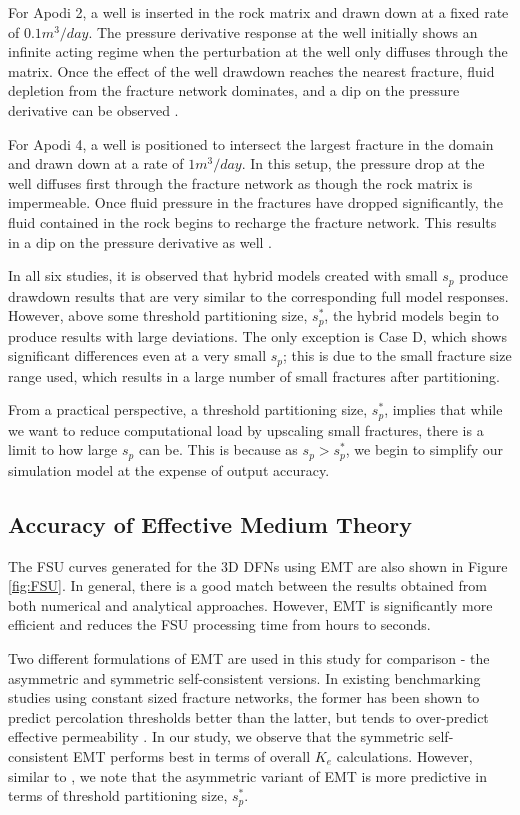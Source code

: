 \documentclass[a4paper]{article}
\begin{document}
For Apodi 2, a well is inserted in the rock matrix and drawn down at a fixed rate of $0.1m^3/day$. The pressure derivative response at the well initially shows an infinite acting regime when the perturbation at the well only diffuses through the matrix. Once the effect of the well drawdown reaches the nearest fracture, fluid depletion from the fracture network dominates, and a dip on the pressure derivative can be observed \citep{Bourdet1989, Cinco-Ley1976, Egya2018}.

For Apodi 4, a well is positioned to intersect the largest fracture in the domain and drawn down at a rate of $1m^3/day$. In this setup, the pressure drop at the well diffuses first through the fracture network as though the rock matrix is impermeable. Once fluid pressure in the fractures have dropped significantly, the fluid contained in the rock begins to recharge the fracture network. This results in a dip on the pressure derivative as well \citep{Gringarten1987}.

In all six studies, it is observed that hybrid models created with small $s_p$ produce drawdown results that are very similar to the corresponding full model responses. However, above some threshold partitioning size, $s_p^*$, the hybrid models begin to produce results with large deviations. The only exception is Case D, which shows significant differences even at a very small $s_p$; this is due to the small fracture size range used, which results in a large number of small fractures after partitioning. 

From a practical perspective, a threshold partitioning size, $s_p^*$, implies that while we want to reduce computational load by upscaling small fractures, there is a limit to how large $s_p$ can be. This is because as $s_p>s_p^*$, we begin to simplify our simulation model at the expense of output accuracy.



\subsection{Accuracy of Effective Medium Theory}
The FSU curves generated for the 3D DFNs using EMT are also shown in Figure \ref{fig:FSU}. In general, there is a good match between the results obtained from both numerical and analytical approaches. However, EMT is significantly more efficient and reduces the FSU processing time from hours to seconds.

Two different formulations of EMT are used in this study for comparison - the asymmetric and symmetric self-consistent versions. In existing benchmarking studies using constant sized fracture networks, the former has been shown to predict percolation thresholds better than the latter, but tends to over-predict effective permeability \citep{Saevik2013, Saevik2014}. In our study, we observe that the symmetric self-consistent EMT performs best in terms of overall $K_e$ calculations. However, similar to \citet{Saevik2013}, we note that the asymmetric variant of EMT is more predictive in terms of threshold partitioning size, $s_p^*$.
\end{document}

